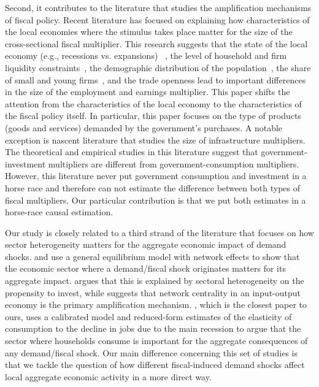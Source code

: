 \documentclass[dv_diss_main.tex]{subfiles}
\begin{document}
Second, it contributes to the literature that studies the amplification mechanisms of fiscal policy. Recent literature has focused on explaining how characteristics of the local economies where the stimulus takes place matter for the size of the cross-sectional fiscal multiplier. This research suggests that the state of the local economy (e.g., recessions vs. expansions) ~\citep{cohen2011powerful, serrato2016estimating,buchheim2020job}, the level of household and firm liquidity constraints~\citep{Hagedorn2019, Auclert2018, Demyanyk2019,auerbach2020effects, bruckner2014local}, the demographic distribution of the population~\citep{basso2021young}, the share of small and young firms~\citep{Juarros2021}, and the trade openness\citep{corbi2019regional} lead to important differences in the size of the employment and earnings multiplier. This paper shifts the attention from the characteristics of the local economy to the characteristics of the fiscal policy itself. In particular, this paper focuses on the type of products (goods and services) demanded by the government's purchases. A notable exception is nascent literature that studies the size of infrastructure multipliers. The theoretical \citep{Boehm2020, ramey2020macroeconomic} and empirical studies \citep{buchheim2017employment,garin2019putting} in this literature suggest that government-investment multipliers are different from government-consumption multipliers. However, this literature never put government consumption and investment in a horse race and therefore can not estimate the difference between both types of fiscal multipliers. Our particular contribution is that we put both estimates in a horse-race causal estimation.

Our study is closely related to a third strand of the literature that focuses on how sector heterogeneity matters for the aggregate economic impact of demand shocks.\cite{vom2022investment} and \cite{bouakez2020government} use a general equilibrium model with network effects to show that the economic sector where a demand/fiscal shock originates matters for its aggregate impact.\cite{vom2022investment} argues that this is explained by sectoral heterogeneity on the propensity to invest, while \cite{bouakez2020government} suggests that network centrality in an input-output economy is the primary amplification mechanism. \cite{Alonso2017}, which is the closest paper to ours, uses a calibrated model and reduced-form estimates of the elasticity of consumption to the decline in jobs due to the main recession to argue that the sector where households consume is important for the aggregate consequences of any demand/fiscal shock. Our main difference concerning this set of studies is that we tackle the question of how different fiscal-induced demand shocks affect local aggregate economic activity in a more direct way.  
\end{document}
